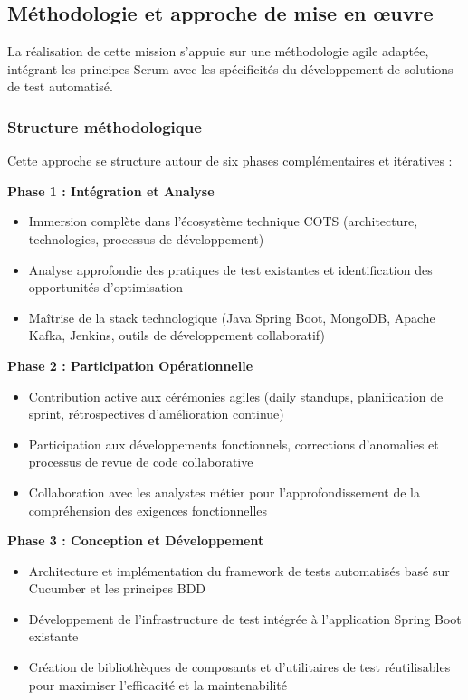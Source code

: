 \subsection{Méthodologie et approche de mise en œuvre}

La réalisation de cette mission s'appuie sur une méthodologie agile adaptée, intégrant les principes Scrum avec les spécificités du développement de solutions de test automatisé.

\subsubsection{Structure méthodologique}

Cette approche se structure autour de six phases complémentaires et itératives :

\textbf{Phase 1 : Intégration et Analyse}
\begin{itemize}
    \item Immersion complète dans l'écosystème technique COTS (architecture, technologies, processus de développement)
    \item Analyse approfondie des pratiques de test existantes et identification des opportunités d'optimisation
    \item Maîtrise de la stack technologique (Java Spring Boot, MongoDB, Apache Kafka, Jenkins, outils de développement collaboratif)
\end{itemize}

\textbf{Phase 2 : Participation Opérationnelle}
\begin{itemize}
    \item Contribution active aux cérémonies agiles (daily standups, planification de sprint, rétrospectives d'amélioration continue)
    \item Participation aux développements fonctionnels, corrections d'anomalies et processus de revue de code collaborative
    \item Collaboration avec les analystes métier pour l'approfondissement de la compréhension des exigences fonctionnelles
\end{itemize}

\textbf{Phase 3 : Conception et Développement}
\begin{itemize}
    \item Architecture et implémentation du framework de tests automatisés basé sur Cucumber et les principes BDD
    \item Développement de l'infrastructure de test intégrée à l'application Spring Boot existante
    \item Création de bibliothèques de composants et d'utilitaires de test réutilisables pour maximiser l'efficacité et la maintenabilité
\end{itemize}

